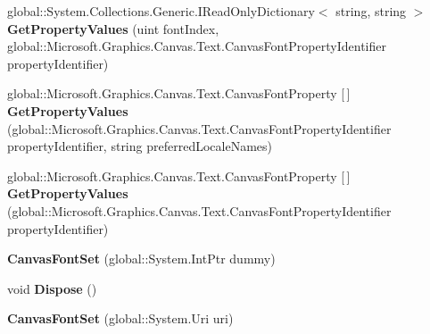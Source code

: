 \begin{DoxyCompactItemize}
global\+::\+System.\+Collections.\+Generic.\+I\+Read\+Only\+Dictionary$<$ string, string $>$ {\bfseries Get\+Property\+Values} (uint font\+Index, global\+::\+Microsoft.\+Graphics.\+Canvas.\+Text.\+Canvas\+Font\+Property\+Identifier property\+Identifier)
\item 
\mbox{\label{class_microsoft_1_1_graphics_1_1_canvas_1_1_text_1_1_canvas_font_set_aa821ceb086ad0eb5aed484241b6bea7a}} 
global\+::\+Microsoft.\+Graphics.\+Canvas.\+Text.\+Canvas\+Font\+Property \mbox{[}$\,$\mbox{]} {\bfseries Get\+Property\+Values} (global\+::\+Microsoft.\+Graphics.\+Canvas.\+Text.\+Canvas\+Font\+Property\+Identifier property\+Identifier, string preferred\+Locale\+Names)
\item 
\mbox{\label{class_microsoft_1_1_graphics_1_1_canvas_1_1_text_1_1_canvas_font_set_ad5ad519ae1f152fedadf48d0d911f919}} 
global\+::\+Microsoft.\+Graphics.\+Canvas.\+Text.\+Canvas\+Font\+Property \mbox{[}$\,$\mbox{]} {\bfseries Get\+Property\+Values} (global\+::\+Microsoft.\+Graphics.\+Canvas.\+Text.\+Canvas\+Font\+Property\+Identifier property\+Identifier)
\item 
\mbox{\label{class_microsoft_1_1_graphics_1_1_canvas_1_1_text_1_1_canvas_font_set_aed5c881dc2a997f7281bf32d019b0d26}} 
{\bfseries Canvas\+Font\+Set} (global\+::\+System.\+Int\+Ptr dummy)
\item 
\mbox{\label{class_microsoft_1_1_graphics_1_1_canvas_1_1_text_1_1_canvas_font_set_a8f2287005fb2f87cc3459710f9266acc}} 
void {\bfseries Dispose} ()
\item 
\mbox{\label{class_microsoft_1_1_graphics_1_1_canvas_1_1_text_1_1_canvas_font_set_a1113ba1353deb4c7fe0e1a7dc51973da}} 
{\bfseries Canvas\+Font\+Set} (global\+::\+System.\+Uri uri)
\item 
\mbox{\label{class_microsoft_1_1_graphics_1_1_canvas_1_1_text_1_1_canvas_font_set_aefa89c8fcefa001d0d56c7165ffb79ac}} 

\end{DoxyCompactItemize}
